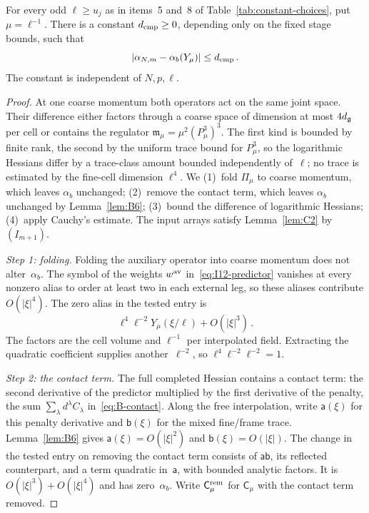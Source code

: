 \begin{lemma}\label{lem:C6}
For every odd $\ell\ge u_j$ as in items~5 and~8 of Table~\ref{tab:constant-choices}, put $\mu=\ell^{-1}$. There is a constant $d_{\rm cmp}\ge0$, depending only on the fixed stage bounds, such that
\begin{equation*}
|\alpha_{N,m}-\alpha_b(Y_\mu)|\le d_{\rm cmp}\,.
\end{equation*}
The constant is independent of $N,p,\ell$.
\end{lemma}

\begin{proof}
At one coarse momentum both operators act on the same joint space. Their difference either factors through a coarse space of dimension at most $4d_{\mathfrak{g}}$ per cell or contains the regulator $\mathfrak m_\mu=\mu^2(P_\mu^3)^3$. The first kind is bounded by finite rank, the second by the uniform trace bound for $P_\mu^3$, so the logarithmic Hessians differ by a trace-class amount bounded independently of~$\ell$; no trace is estimated by the fine-cell dimension $\ell^4$. We (1)~fold $\Pi_\mu$ to coarse momentum, which leaves $\alpha_b$ unchanged; (2)~remove the contact term, which leaves $\alpha_b$ unchanged by Lemma~\ref{lem:B6}; (3)~bound the difference of logarithmic Hessians; (4)~apply Cauchy's estimate. The input arrays satisfy Lemma~\ref{lem:C2} by~$(I_{m+1})$.

\emph{Step 1: folding.} Folding the auxiliary operator into coarse momentum does not alter~$\alpha_b$. The symbol of the weights $w^{\rm av}$ in~\eqref{eq:I12-predictor} vanishes at every nonzero alias to order at least two in each external leg, so these aliases contribute $O(|\xi|^4)$. The zero alias in the tested entry is
\begin{equation*}
\ell^4\ell^{-2}Y_\mu(\xi/\ell)+O(|\xi|^3)\,.
\end{equation*}
The factors are the cell volume and $\ell^{-1}$ per interpolated field. Extracting the quadratic coefficient supplies another~$\ell^{-2}$, so $\ell^4\ell^{-2}\ell^{-2}=1$.

\emph{Step 2: the contact term.} The full completed Hessian contains a contact term: the second derivative of the predictor multiplied by the first derivative of the penalty, the sum $\sum_\lambda d^\lambda C_\lambda$ in~\eqref{eq:B-contact}. Along the free interpolation, write $\mathsf a(\xi)$ for this penalty derivative and $\mathsf b(\xi)$ for the mixed fine/frame trace. Lemma~\ref{lem:B6} gives $\mathsf a(\xi)=O(|\xi|^2)$ and $\mathsf b(\xi)=O(|\xi|)$. The change in the tested entry on removing the contact term consists of $\mathsf a\mathsf b$, its reflected counterpart, and a term quadratic in~$\mathsf a$, with bounded analytic factors. It is $O(|\xi|^3)+O(|\xi|^4)$ and has zero~$\alpha_b$. Write $\mathsf C^{\rm rem}_\mu$ for $\mathsf C_\mu$ with the contact term removed.


\end{proof}
